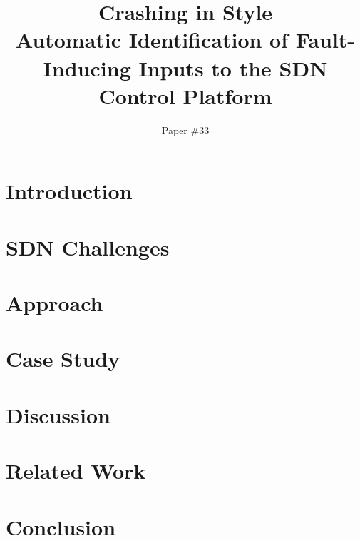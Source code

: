 \documentclass{sig-alt-hotnets}
\title{Crashing in Style \\ Automatic Identification of Fault-Inducing Inputs to the SDN Control Platform}
\author{Paper \#33}
\begin{document}
    \date{}
    \maketitle

    \thispagestyle{empty}

\abstract{{\it }}

\section{Introduction}
\label{sec:intro}


\section{SDN Challenges}
\label{sec:overview}


\section{Approach}
\label{sec:approach}


\section{Case Study}
\label{sec:casestudy}


\section{Discussion}
\label{sec:discussion}


\section{Related Work}
\label{sec:related_work}


\section{Conclusion}
\label{sec:conclusion}


 \small 

%
\end{document}
